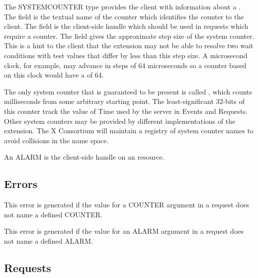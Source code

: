 The SYSTEMCOUNTER type provides the client with information about a
. The  field is the textual name of the
counter which identifies the counter to the client. The  field
is the client-side handle which should be used in requests which require a
counter. The  field gives the approximate step size of the
system counter. This is a hint to the client that the extension may not be
able to resolve two wait conditions with test values that differ by less than
this step size. A microsecond clock, for example, may advance in steps of 64
microseconds so a counter based on this clock would have a 
of 64.

The only system counter that is guaranteed to be present is called
, which counts milliseconds from some arbitrary starting
point. The least-significant 32-bits of this counter track the value of Time
used by the server in Events and Requests. Other system counters may be
provided by different implementations of the extension. The X Consortium will
maintain a registry of system counter names to avoid collisions in the
name space.

An ALARM is the client-side handle on an  resource.

\subsection*{Errors}

\begin{description}


This error is generated if the value for a COUNTER argument in a request does
not name a defined COUNTER.


This error is generated if the value for an ALARM argument in a request does
not name a defined ALARM.

\end{description}

\subsection*{Requests}


